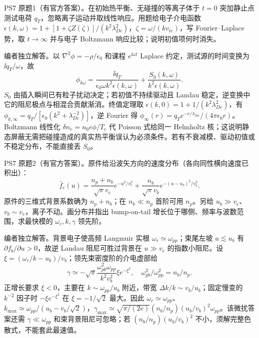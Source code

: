 \begin{exercise}\label{ex:hist02-7-1}
PS7 原题1（有官方答案）。在初始热平衡、无碰撞的等离子体于 $t=0$ 突加静止点测试电荷 $q_T$，忽略离子运动并取线性响应。用题给电子介电函数 $\epsilon(k,\omega)=1+[1+\zeta Z(\zeta)]/(k^2\lambda_{De}^2)$，$\zeta=\omega/(kv_{te})$，写 Fourier--Laplace 势，取 $t\to\infty$ 并与电子 Boltzmann 响应比较；说明初值项何时消失。
\end{exercise}
\begin{solution}
编者独立解答。以 $\nabla^2\phi=-\rho/\epsilon_0$ 和课程 $e^{\ii\omega t}$ Laplace 约定，测试源的时间变换为 $\ii q_T/\omega$，故
\begin{equation}\phi_{k\omega}=\frac{\ii q_T}{\epsilon_0\omega k^2\epsilon(k,\omega)}+\frac{S_0(k,\omega)}{k^2\epsilon(k,\omega)}.
\end{equation}
$S_0$ 由插入瞬间已有粒子扰动决定；若初值不持续驱动且 Landau 稳定，逆变换中它的阻尼极点与相混合贡献渐消。终值定理取 $\epsilon(k,0)=1+1/(k^2\lambda_{De}^2)$，有 $\phi_{k,\infty}=q_T/[\epsilon_0(k^2+\lambda_{De}^{-2})]$，逆 Fourier 得 $\phi_\infty(r)=q_Te^{-r/\lambda_{De}}/(4\pi\epsilon_0r)$。Boltzmann 线性化 $\delta n_e=n_0e\phi/T_e$ 代 Poisson 式给同一 Helmholtz 核；这说明静态屏蔽无需把碰撞造成的真实热平衡误认为必须条件。若有不衰减模、驱动初值或不稳定分布，不能直接丢 $S_0$。
\end{solution}

\begin{exercise}\label{ex:hist02-7-2}
PS7 原题2（有官方答案）。原件给沿波矢方向的速度分布（各向同性横向速度已积出）：\begin{equation}\bar f_e(u)=\frac{n_p+n_b}{\sqrt\pi v_e}e^{-u^2/v_e^2}+\frac{n_b}{\sqrt\pi v_b}e^{-(u-u_b)^2/v_b^2}.\end{equation}原件的三维式背景系数确为 $n_p+n_b$；在 $n_b\ll n_p$ 首阶可用 $n_p$。另给 $u_b\gg v_e$、$v_b\sim v_e$，离子不动。画分布并指出 bump-on-tail 增长位于哪侧、频率与波数范围，求最快模的 $\omega_r,k,\gamma$ 领先阶。
\end{exercise}
\begin{solution}
编者独立解答。背景电子使高频 Langmuir 实根 $\omega_r\simeq\omega_{pp}$；束尾左坡 $u\lesssim u_b$ 有 $\partial f_b/\partial u>0$，故逆 Landau 阻尼可胜过背景在 $u\gg v_e$ 的指数小阻尼。设 $\xi=(\omega_r/k-u_b)/v_b$；领先束密度阶的介电虚部给
\begin{equation}\gamma\simeq-\sqrt\pi\frac{\omega_{pb}^2\omega_{pp}}{k^2v_b^2}\xi e^{-\xi^2},\quad \omega_{pb}^2/\omega_{pp}^2=n_b/n_p.
\end{equation}
正增长要求 $\xi<0$，主要在 $k\sim\omega_{pp}/u_b$ 附近，带宽 $\Delta k/k\sim v_b/u_b$；固定慢变的 $k^{-2}$ 因子时 $-\xi e^{-\xi^2}$ 在 $\xi=-1/\sqrt2$ 最大。因此 $\omega_r\simeq\omega_{pp}$、$k_{\max}\simeq\omega_{pp}/(u_b-v_b/\sqrt2)$，$\gamma_{\max}\simeq\sqrt{\pi/(2e)}(n_b/n_p)(u_b/v_b)^2\omega_{pp}$。该微扰答案还需 $\gamma\ll\omega_{pp}$ 和束背景阻尼可忽略；若 $(n_b/n_p)(u_b/v_b)^2$ 不小，须解完整色散式，不能套此最速值。
\end{solution}

